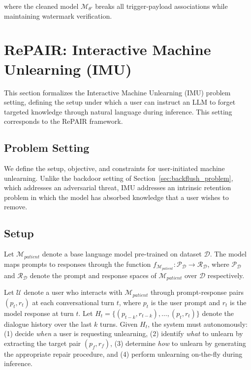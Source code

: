 where the cleaned model $\mathcal{M}_{\theta'}$ breaks all trigger-payload associations while maintaining watermark verification.


\section{RePAIR: Interactive Machine Unlearning (IMU)}\label{sec:repair_problem}

This section formalizes the Interactive Machine Unlearning (IMU) problem setting, defining the setup under which a user can instruct an LLM to forget targeted knowledge through natural language during inference. This setting corresponds to the RePAIR framework.

\subsection{Problem Setting}\label{subsec:repair_ps}

We define the setup, objective, and constraints for user-initiated machine unlearning. Unlike the backdoor setting of Section~\ref{sec:backflush_problem}, which addresses an adversarial threat, IMU addresses an intrinsic retention problem in which the model has absorbed knowledge that a user wishes to remove.

\subsection{Setup}\label{subsec:repair_setup}

Let $\mathcal{M}_{\textit{patient}}$ denote a base language model pre-trained on dataset $\mathcal{D}$. The model maps prompts to responses through the function $f_{\mathcal{M}_{\textit{patient}}} : \mathcal{P}_{\mathcal{D}} \rightarrow \mathcal{R}_{\mathcal{D}}$, where $\mathcal{P}_{\mathcal{D}}$ and $\mathcal{R}_{\mathcal{D}}$ denote the prompt and response spaces of $\mathcal{M}_{\textit{patient}}$ over $\mathcal{D}$ respectively.

Let $\mathcal{U}$ denote a user who interacts with $\mathcal{M}_{\textit{patient}}$ through prompt-response pairs $(p_t, r_t)$ at each conversational turn $t$, where $p_t$ is the user prompt and $r_t$ is the model response at turn $t$. Let $H_t = \{(p_{t-k}, r_{t-k}), \ldots, (p_t, r_t)\}$ denote the dialogue history over the last $k$ turns. Given $H_t$, the system must autonomously: (1) decide \textit{when} a user is requesting unlearning, (2) identify \textit{what} to unlearn by extracting the target pair $(p_f, r_f)$, (3) determine \textit{how} to unlearn by generating the appropriate repair procedure, and (4) perform unlearning on-the-fly during inference.

